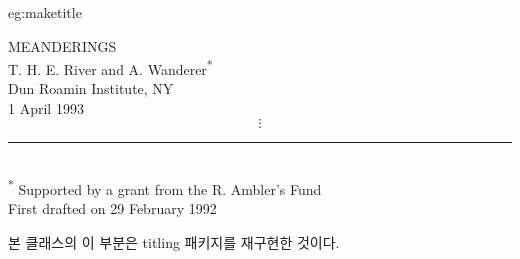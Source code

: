 \begin{egresult}[예시 \cs{maketitle} 표제]{eg:maketitle}
%
\begin{center}
\vspace{0.5\onelineskip}
\begin{minipage}{0.75\textwidth}
\begin{center}
{\Large MEANDERINGS} \\
\vspace*{2ex}
T. H. E. River and A. Wanderer\textsuperscript{*} \\
Dun Roamin Institute, NY \\
\vspace*{2ex}
1 April 1993\textsuperscript{\dag}
\begin{displaymath}
\vdots
\end{displaymath}
\end{center}
\begin{footnotesize}
\rule{0.3\textwidth}{0.4pt} \\
\noindent
\textsuperscript{*} Supported by a grant from the R. Ambler's Fund \\
\textsuperscript{\dag} First drafted on 29 February 1992
\end{footnotesize}
\end{minipage}
\vspace{0.75\onelineskip}
\end{center}

\end{egresult}

본 클래스의 이 부분은 \textsf{titling} 패키지\cite{TITLING}를 재구현한 것이다.

